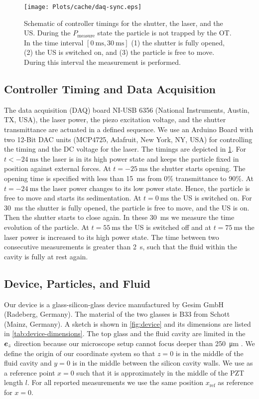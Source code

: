 \begin{figure}[H]
  \centering
  \texttt{[image: Plots/cache/daq-sync.eps]}
  \caption{Schematic of controller timings for the shutter, the laser, and the 
      US. During the $P_{\text{measure}}$ state the particle is not trapped by 
  the OT. In the time interval $[\SI{0}{\ms}, \SI{30}{\ms}]$ (1) the shutter is 
  fully opened, (2) the US is switched on, and (3) the particle is free to 
  move. During this interval the measurement is performed.}\label{fig:daq-sync}
\end{figure}

\subsection{Controller Timing and Data Acquisition}

The data acquisition (DAQ) board NI-USB 6356 (National Instruments, Austin, TX, 
USA), the laser power, the piezo excitation voltage, and the shutter 
transmittance are actuated in a defined sequence. We use an Arduino Board with 
two 12-Bit DAC units (MCP4725, Adafruit, New York, NY, USA) for controlling the 
timing and the DC voltage for the laser. The timings are depicted in 
\cref{fig:daq-sync}. For $t<-\SI{24}{\ms}$ the laser is in its high power state 
and keeps the particle fixed in position against external forces. At 
$t=\SI{-25}{\ms}$ the shutter starts opening. The opening time is specified 
with less than \SI{15}{\ms} from 0\% transmittance to 90\%. At 
$t=\SI{-24}{\ms}$ the laser power changes to its low power state. Hence, the 
particle is free to move and starts its sedimentation. At $t=\SI{0}{\ms}$ the 
US is switched on. For \SI{30}{\ms} the shutter is fully opened, the particle 
is free to move, and the US is on. Then the shutter starts to close again. In 
these \SI{30}{\ms} we measure the time evolution of the particle. At 
$t=\SI{55}{\ms}$ the US is switched off and at $t=\SI{75}{\ms}$ the laser power 
is increased to its high power state. The time between two consecutive 
measurements is greater than \SI{2}{\s}, such that the fluid within the cavity 
is fully at rest again.

\subsection{Device, Particles, and Fluid}

Our device is a glass-silicon-glass device manufactured by Gesim GmbH 
(Radeberg, Germany). The material of the two glasses is B33 from Schott (Mainz, 
Germany). A sketch is shown in \cref{fig:device} and its dimensions are listed 
in \cref{tab:device-dimensions}. The top glass and the fluid cavity are limited 
in the $\bm{e}_{z}$ direction because our microscope setup cannot focus deeper than 
\SI{250}{\um} \cite{Lamprecht2016,Lamprecht2017}. We define the origin of our 
coordinate system so that $z = 0$ is in the middle of the fluid cavity and $y = 
0$ is in the middle between the silicon cavity walls. We use as a reference 
point $x = 0$ such that it is approximately in the middle of the PZT length 
$l$. For all reported measurements we use the same position $x_{\text{ref}}$ as 
reference for $x=0$.

